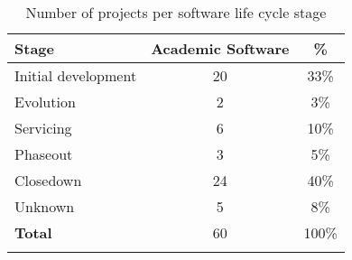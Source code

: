 \begin{table}[ht]
  \caption{Number of projects per software life cycle stage}
  \centering
  \begin{tabular}{l c c}
    \hline
    {\bf Stage} & {\bf Academic Software} & {\bf \%} \\
    \hline
      Initial development & 20 & 33\% \\
      Evolution           & 2  & 3\%  \\
      Servicing           & 6  & 10\% \\
      Phaseout            & 3  & 5\%  \\
      Closedown           & 24 & 40\% \\
      Unknown             & 5  & 8\%  \\
    \hline
      {\bf Total}         & 60 & 100\% \\
    \hline
    \label{life-cycle-table}
  \end{tabular}
\end{table}
